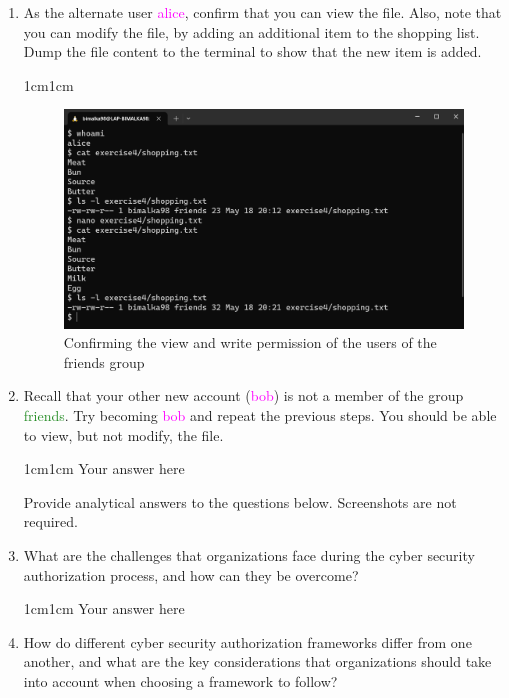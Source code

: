 \documentclass[11pt,letterpaper]{article}
\newenvironment{answer}{\em \color{blue} \begin{adjustwidth}{1cm}{1cm}}{\end{adjustwidth}}
\begin{document}
\begin{enumerate}
		\item As the alternate user \textcolor{magenta}{alice}, confirm that you can view the file. Also, note that you can modify the file, by adding an additional item to the shopping list. Dump the file content to the terminal to show that the new item is added.
		
		\begin{answer}
			\begin{figure}[H]
				\centering
				\includegraphics[width=0.65\columnwidth]{images/q11_1}
				\caption{Confirming the view and write permission of the users of the friends group} \label{fig:q11_1}
			\end{figure}
		\end{answer}
		
		\item Recall that your other new account (\textcolor{magenta}{bob}) is not a member of the group \textcolor{ForestGreen}{friends}. Try becoming \textcolor{magenta}{bob} and repeat the previous steps. You should be able to view, but not modify, the file.
		
		\begin{answer}
			Your answer here
		\end{answer}
		
		\vspace{5mm}
		
		Provide analytical answers to the questions below. Screenshots are not required.
		
		\item What are the challenges that organizations face during the cyber security authorization process, and how can they be overcome?
		
		\begin{answer}
			Your answer here
		\end{answer}
		
		\item How do different cyber security authorization frameworks differ from one another, and what are the key considerations that organizations should take into account when choosing a framework to follow?
		

\end{enumerate}
\end{document}
